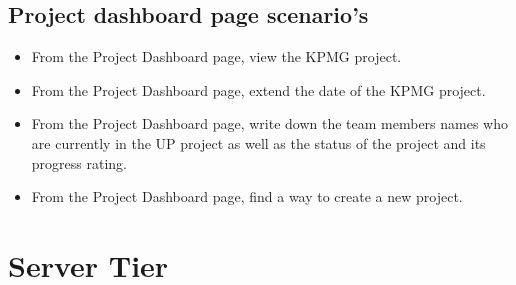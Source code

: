 \documentclass[]{article}
\begin{document}
	\subsection{Project dashboard page scenario's}
	\begin{itemize}
	    \item From the Project Dashboard page, view the KPMG project.
	    
	    \item From the Project Dashboard page, extend the date of the KPMG project.
	    
	    \item From the Project Dashboard page, write down the team members names who are currently in the UP project as well as the status of the project and its progress rating.
	    
	    \item From the Project Dashboard page, find a way to create a new project.
	\end{itemize}
	
	\section{Server Tier}
\end{document}
